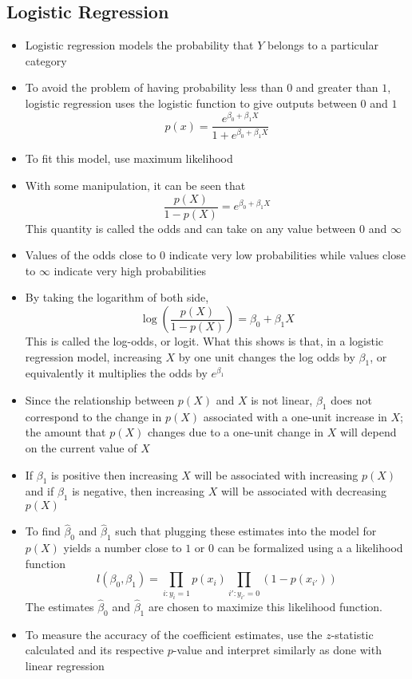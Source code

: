 \documentclass[12pt]{article}
\begin{document}
\subsection{Logistic Regression} 
\begin{itemize} 
\item Logistic regression models the probability that $Y$ belongs to a particular category 
\item To avoid the problem of having probability less than $0$ and greater than $1$, logistic regression uses the logistic function to give outputs between $0$ and $1$
$$ p(x) = \frac{e^{\beta_0 + \beta_1X}}{1 + e^{\beta_0 + \beta_1X}} $$ 
\item To fit this model, use maximum likelihood 
\item With some manipulation, it can be seen that $$ \frac{p(X)}{1 - p(X)} = e^{\beta_0 + \beta_1X} $$ This quantity is called the odds and can take on any value between $0$ and $\infty$
\item Values of the odds close to $0$ indicate very low probabilities while values close to $\infty$ indicate very high probabilities 
\item By taking the logarithm of both side, $$ \log \left( \frac{p(X)}{1-p(X)} \right) = \beta_0 + \beta_1X $$ This is called the log-odds, or logit. What this shows is that, in a logistic regression model, increasing $X$ by one unit changes the log odds by $\beta_1$, or equivalently it multiplies the odds by $e^{\beta_1}$
\item Since the relationship between $p(X)$ and $X$ is not linear, $\beta_1$ does not correspond to the change in $p(X)$ associated with a one-unit increase in $X$; the amount that $p(X)$ changes due to a one-unit change in $X$ will depend on the current value of $X$ 
\item If $\beta_1$ is positive then increasing $X$ will be associated with increasing $p(X)$ and if $\beta_1$ is negative, then increasing $X$ will be associated with decreasing $p(X)$
\item To find $\hat{\beta}_0$ and $\hat{\beta}_1$ such that plugging these estimates into the model for $p(X)$ yields a number close to $1$ or $0$ can be formalized using a a likelihood function $$ l(\beta_0, \beta_1) = \prod_{i: y_i = 1} p(x_i) \prod_{i': y_{i'} = 0} (1 - p(x_{i'})) $$ The estimates $\hat{\beta}_0$ and $\hat{\beta}_1$ are chosen to maximize this likelihood function. 
\item To measure the accuracy of the coefficient estimates, use the $z$-statistic calculated and its respective $p$-value and interpret similarly as done with linear regression 

\end{itemize}
\end{document}

